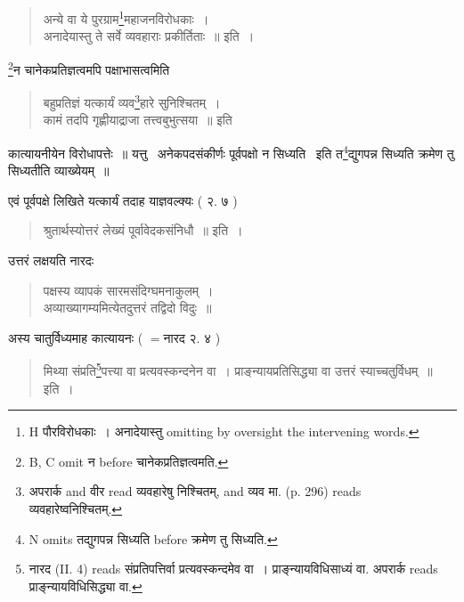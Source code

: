 \documentclass[11pt, openany]{book}
\begin{document}
\newpage
{}

\begin{quote}
{\vy अन्ये वा ये पुरग्राम\renewcommand{\thefootnote}{1}\footnote{H पौरविरोधकाः~। अनादेयास्तु omitting by oversight the intervening words.}महाजनविरोधकाः~।\\
अनादेयास्तु ते सर्वे व्यवहाराः प्रकीर्तिताः~॥} इति~।
\end{quote}

\renewcommand{\thefootnote}{2}\footnote{B, C omit न before चानेकप्रतिज्ञत्वमति.}न चानेकप्रतिज्ञत्वमपि पक्षाभासत्वमिति

\begin{quote}
{\vy बहुप्रतिज्ञं यत्कार्यं व्यव\renewcommand{\thefootnote}{3}\footnote{अपरार्क and वीर read व्यवहारेषु निश्चितम्, and व्यव मा. (p. 296) reads व्यवहारेष्वनिश्चितम्.}हारे सुनिश्चितम्~।\\
कामं तदपि गृह्णीयाद्राजा तत्त्वबुभुत्सया~॥} इति
\end{quote}

कात्यायनीयेन विरोधापत्तेः~॥ यत्तु \textendash\ अनेकपदसंकीर्णः पूर्वपक्षो न सिध्यति \textendash\ इति त\renewcommand{\thefootnote}{4}\footnote{N omits तद्युगपन्न सिध्यति before क्रमेण तु सिध्यति.}द्युगपन्न सिध्यति क्रमेण तु सिध्यतीति व्याख्येयम्~॥

एवं पूर्वपक्षे लिखिते यत्कार्यं तदाह याज्ञवल्क्यः ( २. ७ )

\begin{quote}
{\vy श्रुतार्थस्योत्तरं लेख्यं पूर्वावेदकसंनिधौ~॥} इति~।
\end{quote}

उत्तरं लक्षयति नारदः

\begin{quote}
{\vy पक्षस्य व्यापकं सारमसंदिग्घमनाकुलम्~।\\
अव्याख्यागम्यमित्येतदुत्तरं तद्विदो विदुः~॥}
\end{quote}

अस्य चातुर्विध्यमाह कात्यायनः ( $=$नारद २. ४ )

\begin{quote}
{\vy मिथ्या संप्रति\renewcommand{\thefootnote}{5}\footnote{नारद (II. 4) reads संप्रतिपत्तिर्वा प्रत्यवस्कन्दमेव वा~। प्राङ्न्यायविधिसाध्यं वा. अपरार्क reads प्राङ्न्यायविधिसिद्ध्या वा.}पत्त्या वा प्रत्यवस्कन्दनेन वा~।
प्राङ्न्यायप्रतिसिद्ध्या वा उत्तरं स्याच्चतुर्विधम्~॥} इति~।
\end{quote}

\newpage
{}
\end{document}
